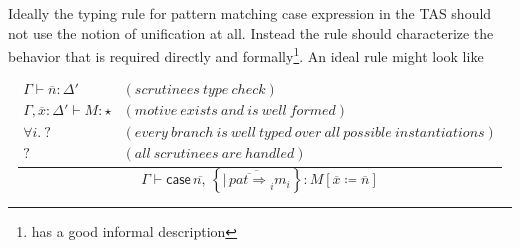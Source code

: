 
Ideally the typing rule for pattern matching case expression in the TAS should not use the notion of unification at all.
Instead the rule should characterize the behavior that is required directly and formally\footnote{\cite{coquand1992pattern} has a good informal description}.
An ideal rule might look like

\[
\frac{\begin{array}{cl}
\Gamma\vdash\overline{n}:\Delta' & (scrutinees\ type\ check)\\
\Gamma,\overline{x}:\Delta'\vdash M:\star & (motive\ exists\ and\ is\ well\ formed)\\
\forall i.\:? & (every\ branch\ is\ well\ typed\ over\ all\ possible\ instantiations)\\
? & (all\ scrutinees\ are\ handled)
\end{array}}{\Gamma\vdash\mathsf{case}\,\overline{n,}\,\left\{ \overline{|\,\overline{pat\Rightarrow}_{i}m_{i}}\right\} :M\left[\overline{x}\coloneqq\overline{n}\right]}
\]

